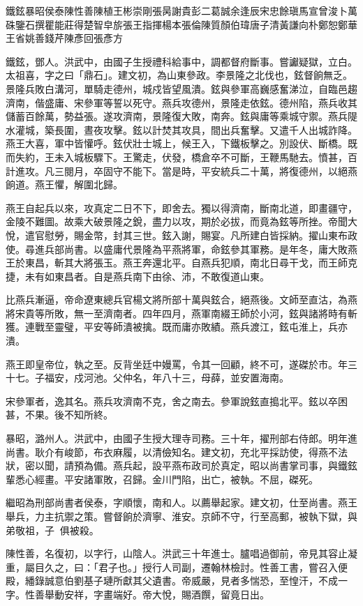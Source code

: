 
\begin{pinyinscope}
鐵鉉暴昭侯泰陳性善陳植王彬崇剛張昺謝貴彭二葛誠余逢辰宋忠餘瑱馬宣曾浚卜萬硃鑒石撰瞿能莊得楚智皁旂張王指揮楊本張倫陳質顏伯瑋唐子清黃謙向朴鄭恕鄭華王省姚善錢芹陳彥回張彥方

鐵鉉，鄧人。洪武中，由國子生授禮科給事中，調都督府斷事。嘗讞疑獄，立白。太祖喜，字之曰「鼎石」。建文初，為山東參政。李景隆之北伐也，鉉督餉無乏。景隆兵敗白溝河，單騎走德州，城戍皆望風潰。鉉與參軍高巍感奮涕泣，自臨邑趨濟南，偕盛庸、宋參軍等誓以死守。燕兵攻德州，景隆走依鉉。德州陷，燕兵收其儲蓄百餘萬，勢益張。遂攻濟南，景隆復大敗，南奔。鉉與庸等乘城守禦。燕兵隄水灌城，築長圍，晝夜攻擊。鉉以計焚其攻具，間出兵奮擊。又遣千人出城詐降。燕王大喜，軍中皆懽呼。鉉伏壯士城上，候王入，下鐵板擊之。別設伏、斷橋。既而失約，王未入城板驟下。王驚走，伏發，橋倉卒不可斷，王鞭馬馳去。憤甚，百計進攻。凡三閱月，卒固守不能下。當是時，平安統兵二十萬，將復德州，以絕燕餉道。燕王懼，解圍北歸。

燕王自起兵以來，攻真定二日不下，即舍去。獨以得濟南，斷南北道，即畫疆守，金陵不難圖。故乘大破景隆之銳，盡力以攻，期於必拔，而竟為鉉等所挫。帝聞大悅，遣官慰勞，賜金幣，封其三世。鉉入謝，賜宴。凡所建白皆採納。擢山東布政使。尋進兵部尚書。以盛庸代景隆為平燕將軍，命鉉參其軍務。是年冬，庸大敗燕王於東昌，斬其大將張玉。燕王奔還北平。自燕兵犯順，南北日尋干戈，而王師克捷，未有如東昌者。自是燕兵南下由徐、沛，不敢復道山東。

比燕兵漸逼，帝命遼東總兵官楊文將所部十萬與鉉合，絕燕後。文師至直沽，為燕將宋貴等所敗，無一至濟南者。四年四月，燕軍南綴王師於小河，鉉與諸將時有斬獲。連戰至靈璧，平安等師潰被擒。既而庸亦敗績。燕兵渡江，鉉屯淮上，兵亦潰。

燕王即皇帝位，執之至。反背坐廷中嫚罵，令其一回顧，終不可，遂磔於市。年三十七。子福安，戍河池。父仲名，年八十三，母薛，並安置海南。

宋參軍者，逸其名。燕兵攻濟南不克，舍之南去。參軍說鉉直搗北平。鉉以卒困甚，不果。後不知所終。

暴昭，潞州人。洪武中，由國子生授大理寺司務。三十年，擢刑部右侍郎。明年進尚書。耿介有峻節，布衣麻履，以清儉知名。建文初，充北平採訪使，得燕不法狀，密以聞，請預為備。燕兵起，設平燕布政司於真定，昭以尚書掌司事，與鐵鉉輩悉心經畫。平安諸軍敗，召歸。金川門陷，出亡，被執。不屈，磔死。

繼昭為刑部尚書者侯泰，字順懷，南和人。以薦舉起家。建文初，仕至尚書。燕王舉兵，力主抗禦之策。嘗督餉於濟寧、淮安。京師不守，行至高郵，被執下獄，與弟敬祖，子，俱被殺。

陳性善，名復初，以字行，山陰人。洪武三十年進士。臚唱過御前，帝見其容止凝重，屬目久之，曰：「君子也。」授行人司副，遷翰林檢討。性善工書，嘗召入便殿，繙錄誠意伯劉基子璉所獻其父遺書。帝威嚴，見者多惴恐，至惶汗，不成一字。性善舉動安祥，字畫端好。帝大悅，賜酒饌，留竟日出。


\end{pinyinscope}

